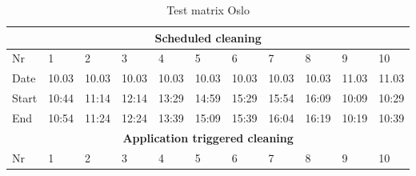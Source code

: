 \begin{table}[H]
\centering
\small
\caption{Test matrix Oslo}
\label{tab:TestMatrixEnv1}
\begin{tabular}{|lllllllllll|}
\hline
\multicolumn{11}{|c|}{\textbf{Scheduled cleaning}}                                                                                                                                                                                                                                                        \\ \hline
\multicolumn{1}{|l|}{Nr} & \multicolumn{1}{l|}{1}     & \multicolumn{1}{l|}{2}     & \multicolumn{1}{l|}{3}     & \multicolumn{1}{l|}{4}     & \multicolumn{1}{l|}{5}     & \multicolumn{1}{l|}{6}     & \multicolumn{1}{l|}{7}     & \multicolumn{1}{l|}{8}     & \multicolumn{1}{l|}{9}     & 10    \\ \hline
\multicolumn{1}{|l|}{Date}   & \multicolumn{1}{l|}{10.03} & \multicolumn{1}{l|}{10.03} & \multicolumn{1}{l|}{10.03} & \multicolumn{1}{l|}{10.03} & \multicolumn{1}{l|}{10.03} & \multicolumn{1}{l|}{10.03} & \multicolumn{1}{l|}{10.03} & \multicolumn{1}{l|}{10.03} & \multicolumn{1}{l|}{11.03} & 11.03 \\ \hline
\multicolumn{1}{|l|}{Start}  & \multicolumn{1}{l|}{10:44} & \multicolumn{1}{l|}{11:14} & \multicolumn{1}{l|}{12:14} & \multicolumn{1}{l|}{13:29} & \multicolumn{1}{l|}{14:59} & \multicolumn{1}{l|}{15:29} & \multicolumn{1}{l|}{15:54} & \multicolumn{1}{l|}{16:09} & \multicolumn{1}{l|}{10:09} & 10:29 \\ \hline
\multicolumn{1}{|l|}{End}    & \multicolumn{1}{l|}{10:54} & \multicolumn{1}{l|}{11:24} & \multicolumn{1}{l|}{12:24} & \multicolumn{1}{l|}{13:39} & \multicolumn{1}{l|}{15:09} & \multicolumn{1}{l|}{15:39} & \multicolumn{1}{l|}{16:04} & \multicolumn{1}{l|}{16:19} & \multicolumn{1}{l|}{10:19} & 10:39 \\ \hline
\multicolumn{11}{|c|}{\textbf{Application triggered cleaning}}                                                                                                                                                                                                                                            \\ \hline
\multicolumn{1}{|l|}{Nr} & \multicolumn{1}{l|}{1}     & \multicolumn{1}{l|}{2}     & \multicolumn{1}{l|}{3}     & \multicolumn{1}{l|}{4}     & \multicolumn{1}{l|}{5}     & \multicolumn{1}{l|}{6}     & \multicolumn{1}{l|}{7}     & \multicolumn{1}{l|}{8}     & \multicolumn{1}{l|}{9}     & 10    \\ \hline

\end{tabular}
\end{table}
